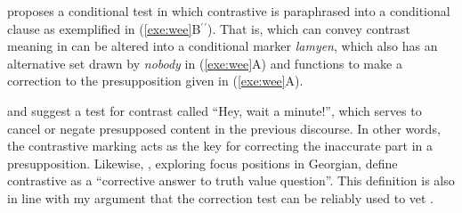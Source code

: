 


\citet{wee:01} proposes a conditional test in which contrastive 
is paraphrased into a conditional clause as exemplified in
(\ref{exe:wee}B$^\ensuremath{\prime}${}$^\ensuremath{\prime}$). That is, \nun which can convey contrast meaning in
 can be altered into a conditional marker \textit{lamyen},
which also has an alternative set drawn by \textit{nobody} in
(\ref{exe:wee}A) and functions to make a correction to the
presupposition given in (\ref{exe:wee}A).




\noindent \citet{fintel:04} and \citet{kim:12b} suggest a test for
contrast called ``Hey, wait a minute!'', which serves to cancel or
negate presupposed content in the previous discourse. In other words,
the contrastive marking acts as the key for correcting the inaccurate
part in a presupposition. Likewise, \citet{skopeteas:fanselow:10},
exploring focus positions in Georgian, define contrastive  as a
``corrective answer to truth value question''.  This definition is
also in line with my argument that the correction test can be reliably
used to vet .













